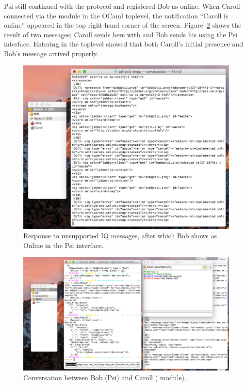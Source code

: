 \documentclass[12pt,a4paper,twoside,openright]{report}
\begin{document}
{Psi still continued with the protocol and registered Bob as online. When Caroll connected via the  module in the OCaml toplevel, the notification ``Caroll is online'' appeared in the top right-hand corner of the screen. Figure~\ref{fig:caroll-msg} shows the result of two messages; Caroll sends hers with  and Bob sends his using the Psi interface. Entering  in the toplevel showed that both Caroll's initial presence and Bob's message arrived properly.

\begin{figure}
  \centering\includegraphics[width=\textwidth]{../transcripts/iq_errors.png}
  \caption{Response to unsupported IQ messages, after which Bob shows as Online in the Psi interface.}
  \label{fig:iq-errors}
\end{figure}

\begin{figure}
  \centering\includegraphics[width=\textwidth]{../transcripts/caroll_msg.png}
  \caption{Conversation between Bob (Psi) and Caroll ( module).}
  \label{fig:caroll-msg}
\end{figure}

}
\end{document}
